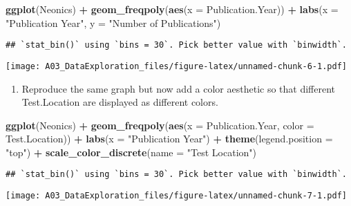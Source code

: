 \documentclass[]{article}
\newenvironment{Shaded}{\begin{snugshade}}{\end{snugshade}}
\newcommand{\DataTypeTok}[1]{\textcolor[rgb]{0.13,0.29,0.53}{#1}}
\newcommand{\KeywordTok}[1]{\textcolor[rgb]{0.13,0.29,0.53}{\textbf{#1}}}
\newcommand{\NormalTok}[1]{#1}
\newcommand{\OperatorTok}[1]{\textcolor[rgb]{0.81,0.36,0.00}{\textbf{#1}}}
\newcommand{\StringTok}[1]{\textcolor[rgb]{0.31,0.60,0.02}{#1}}
\providecommand{\tightlist}{%
  \setlength{\itemsep}{0pt}\setlength{\parskip}{0pt}}
\begin{document}
\begin{Shaded}
\begin{Highlighting}[]
\KeywordTok{ggplot}\NormalTok{(Neonics) }\OperatorTok{+}\StringTok{ }
\StringTok{  }\KeywordTok{geom_freqpoly}\NormalTok{(}\KeywordTok{aes}\NormalTok{(}\DataTypeTok{x =}\NormalTok{ Publication.Year)) }\OperatorTok{+}\StringTok{ }
\StringTok{  }\KeywordTok{labs}\NormalTok{(}\DataTypeTok{x =} \StringTok{"Publication Year"}\NormalTok{, }\DataTypeTok{y =} \StringTok{"Number of Publications"}\NormalTok{)}
\end{Highlighting}
\end{Shaded}

\begin{verbatim}
## `stat_bin()` using `bins = 30`. Pick better value with `binwidth`.
\end{verbatim}

\texttt{[image: A03\_DataExploration\_files/figure-latex/unnamed-chunk-6-1.pdf]}

\begin{enumerate}
\def\labelenumi{\arabic{enumi}.}
\setcounter{enumi}{9}
\tightlist
\item
  Reproduce the same graph but now add a color aesthetic so that
  different Test.Location are displayed as different colors.
\end{enumerate}

\begin{Shaded}
\begin{Highlighting}[]
\KeywordTok{ggplot}\NormalTok{(Neonics) }\OperatorTok{+}\StringTok{ }
\StringTok{  }\KeywordTok{geom_freqpoly}\NormalTok{(}\KeywordTok{aes}\NormalTok{(}\DataTypeTok{x =}\NormalTok{ Publication.Year, }\DataTypeTok{color =}\NormalTok{ Test.Location)) }\OperatorTok{+}\StringTok{ }
\StringTok{  }\KeywordTok{labs}\NormalTok{(}\DataTypeTok{x =} \StringTok{"Publication Year"}\NormalTok{) }\OperatorTok{+}
\StringTok{  }\KeywordTok{theme}\NormalTok{(}\DataTypeTok{legend.position =} \StringTok{"top"}\NormalTok{) }\OperatorTok{+}
\StringTok{  }\KeywordTok{scale_color_discrete}\NormalTok{(}\DataTypeTok{name =} \StringTok{"Test Location"}\NormalTok{)}
\end{Highlighting}
\end{Shaded}

\begin{verbatim}
## `stat_bin()` using `bins = 30`. Pick better value with `binwidth`.
\end{verbatim}

\texttt{[image: A03\_DataExploration\_files/figure-latex/unnamed-chunk-7-1.pdf]}
\end{document}
